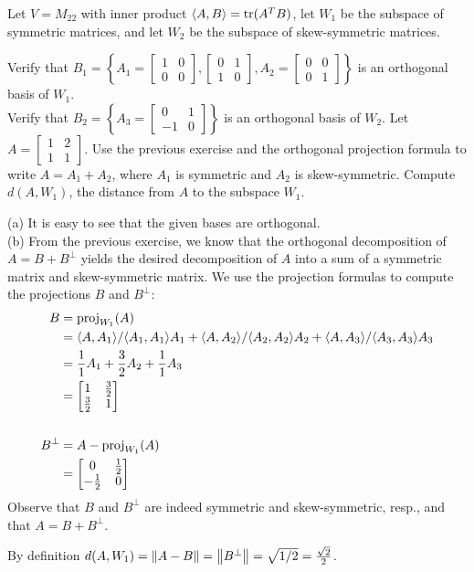 \ii Let $V=M_{22}$ with inner product $\angvec{A,B}=\tr(A^TB)$, let $W_1$ be the subspace of symmetric matrices, and let $W_2$ be the subspace of skew-symmetric matrices. 
\begin{samepage}
\bb
\ii Verify that $B_1=\left\{
A_1=\begin{bmatrix}
1&0\\ 0&0
\end{bmatrix},
\begin{bmatrix}
0&1\\
1&0
\end{bmatrix},
A_2=\begin{bmatrix}
0&0\\
0&1
\end{bmatrix}
\right\}$
is an orthogonal basis of $W_1$. 
\\
Verify that $B_2=\left\{ 
A_3=\begin{bmatrix}
0&1\\
-1&0
\end{bmatrix}
\right\}$
is an orthogonal basis of $W_2$. 
\ii Let $A=\begin{bmatrix}
1&2\\
1&1
\end{bmatrix}$. 
\bb
\ii Use the previous exercise and the orthogonal projection formula to write $A=A_1+A_2$, where $A_1$ is symmetric and $A_2$ is skew-symmetric. 
\ii Compute $d(A,W_1)$, the distance from $A$ to the subspace $W_1$. 
\ee
\ee
\end{samepage}
\begin{solution}
\noindent
(a) It is easy to see that the given bases are orthogonal. 
\\
(b) From the previous exercise, we know that the orthogonal decomposition of $A=B+B^\perp$ yields the desired decomposition of $A$ into a sum of a symmetric matrix and skew-symmetric matrix. We use the projection formulas to compute the projections $B$ and $B^\perp$:
\begin{align*}
B&=\proj{A}{W_1}\\
&=\angvec{A,A_1}/\angvec{A_1,A_1} A_1+\angvec{A,A_2}/\angvec{A_2,A_2} A_2+\angvec{A,A_3}/\angvec{A_3,A_3} A_3\\
&=\frac{1}{1}A_1+\frac{3}{2}A_2+\frac{1}{1}A_3\\
&=\begin{bmatrix}
1&\frac{3}{2}\\
\frac{3}{2}&1
\end{bmatrix}
\\
\\
B^\perp&=A-\proj{A}{W_1}\\
&=\begin{bmatrix}
0&\frac{1}{2}\\
-\frac{1}{2}&0
\end{bmatrix}
\end{align*}
Observe that $B$ and $B^\perp$ are indeed symmetric and skew-symmetric, resp., and that $A=B+B^\perp$. 

By definition $d(A, W_1)=\norm{A-B}=\norm{B^\perp}=\sqrt{1/2}=\frac{\sqrt{2}}{2}$.
\end{solution}
